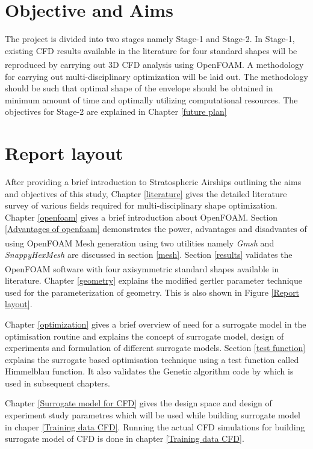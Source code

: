\section{Objective and Aims}
The project is divided into two stages namely Stage-1 and Stage-2. In Stage-1, existing CFD results available in the literature for four standard shapes will be reproduced by carrying out 3D CFD analysis using OpenFOAM\textsuperscript{\textregistered}. A methodology for carrying out multi-disciplinary optimization will be laid out. The methodology should be such that optimal shape of the envelope should be obtained in minimum amount of time and optimally utilizing computational resources. The objectives for Stage-2 are explained in Chapter \ref{future plan}

\section{Report layout}
\label{layout}

After providing a brief introduction to Stratospheric Airships outlining the aims and objectives of this study, Chapter \ref{literature} gives the detailed literature survey of various fields required for multi-disciplinary shape optimization. Chapter \ref{openfoam} gives a brief introduction about OpenFOAM. Section \ref{Advantages of openfoam} demonstrates the power, advantages and disadvantes of using OpenFOAM\textsuperscript{\textregistered}
Mesh generation using two utilities namely \textit{Gmsh} and \textit{SnappyHexMesh} are discussed in section \ref{mesh}. Section \ref{results} validates the OpenFOAM\textsuperscript{\textregistered} software with four axisymmetric standard shapes available in literature. Chapter \ref{geometry}  explains the modified gertler parameter technique used for the parameterization of geometry. This is also shown in Figure \ref{Report layout}.

Chapter \ref{optimization} gives a brief overview of need for a surrogate model in the optimisation routine and explains the concept of surrogate model, design of experiments and formulation of different surrogate models. Section \ref{test function} explains the surrogate based optimisation technique using a test function called Himmelblau function. It also validates the Genetic algorithm code by \cite{Xavier} which is used in subsequent chapters.

Chapter \ref{Surrogate model for CFD} gives the design space and design of experiment study parametres which will be used while building surrogate model in chaper \ref{Training data CFD}. Running the actual CFD simulations for building surrogate model of CFD is done in chapter \ref{Training data CFD}.  

